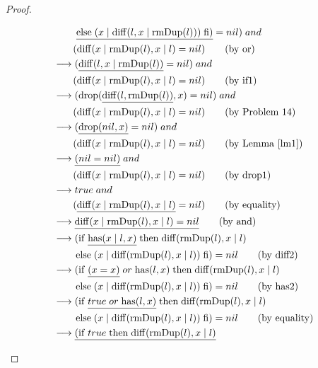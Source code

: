 \documentclass[12pt, a4paper]{article}
\newcommand{\rel}[1]{\mathrel{#1}}
\newcommand{\rmx}[1]{\mathrm{#1}}
\newcommand{\larrow}{\longrightarrow}
\newcommand{\under}{\underline}
\begin{document}
\begin{proof}
\begin{description}
\begin{align*}
	&\quad \quad\ \under{\rel{\rmx{else}} (x \mid \rmx{diff}(l, x \mid \rmx{rmDup}(l))) \rel{\rmx{fi}})} = nil) \rel{and} \\
	&\quad \quad (\rmx{diff}(x \mid \rmx{rmDup}(l), x \mid l) = nil) \tag{by or} \\
	&\larrow (\under{\rmx{diff}(l, x \mid \rmx{rmDup}(l))} = nil) \rel{and} \\
	&\quad \quad (\rmx{diff}(x \mid \rmx{rmDup}(l), x \mid l) = nil) \tag{by if1} \\
	&\larrow (\rmx{drop}(\under{\rmx{diff}(l, \rmx{rmDup}(l))}, x) = nil) \rel{and} \\
	&\quad \quad (\rmx{diff}(x \mid \rmx{rmDup}(l), x \mid l) = nil) \tag{by Problem 14} \\
	&\larrow (\under{\rmx{drop}(nil, x)} = nil) \rel{and} \\
	&\quad \quad (\rmx{diff}(x \mid \rmx{rmDup}(l), x \mid l) = nil) \tag{by Lemma~\ref{lm1}} \\
	&\larrow \under{(nil = nil)} \rel{and} \\
	&\quad \quad (\rmx{diff}(x \mid \rmx{rmDup}(l), x \mid l) = nil) \tag{by drop1} \\
	&\larrow true \rel{and} \\
	&\quad \quad (\under{\rmx{diff}(x \mid \rmx{rmDup}(l), x \mid l)} = nil) \tag{by equality} \\
	&\larrow \under{\rmx{diff}(x \mid \rmx{rmDup}(l), x \mid l) = nil} \tag{by and} \\
	&\larrow (\rel{\rmx{if}} \under{\rmx{has}(x \mid l, x)} \rel{\rmx{then}} \rmx{diff}(\rmx{rmDup}(l), x \mid l) \\
	&\quad \quad \rel{\rmx{else}} (x \mid \rmx{diff}(\rmx{rmDup}(l), x \mid l)) \rel{\rmx{fi}}) = nil \tag{by diff2} \\
	&\larrow (\rel{\rmx{if}} \under{(x = x)} \rel{or} \rmx{has}(l, x) \rel{\rmx{then}} \rmx{diff}(\rmx{rmDup}(l), x \mid l) \\
	&\quad \quad \rel{\rmx{else}} (x \mid \rmx{diff}(\rmx{rmDup}(l), x \mid l)) \rel{\rmx{fi}}) = nil \tag{by has2} \\
	&\larrow (\rel{\rmx{if}} \under{true \rel{or} \rmx{has}(l, x)} \rel{\rmx{then}} \rmx{diff}(\rmx{rmDup}(l), x \mid l) \\
	&\quad \quad \rel{\rmx{else}} (x \mid \rmx{diff}(\rmx{rmDup}(l), x \mid l)) \rel{\rmx{fi}}) = nil \tag{by equality} \\
	&\larrow \under{(\rel{\rmx{if}} true \rel{\rmx{then}} \rmx{diff}(\rmx{rmDup}(l), x \mid l)} \\

\end{align*}
\end{description}
\end{proof}
\end{document}
